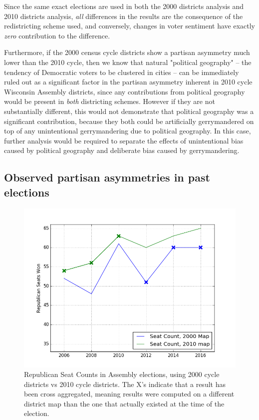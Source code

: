\documentclass[preprint,12pt]{article}
\begin{document}
Since the same exact elections are used in both the 2000 districts analysis and 2010 districts analysis, \emph{all} differences in the results are the consequence of the redistricting scheme used, and conversely, changes in voter sentiment have exactly \emph{zero} contribution to the difference.

Furthermore, if the 2000 census cycle districts show a partisan asymmetry much lower than the 2010 cycle, then we know that natural "political geography" -- the tendency of Democratic voters to be clustered in cities -- can be immediately ruled out as a significant factor in the partisan asymmetry inherent in 2010 cycle Wisconsin Assembly districts, since any contributions from political geography would be present in \emph{both} districting schemes.
However if they are not substantially different, this would not demonstrate that political geography was a significant contribution, because they both could be artificially gerrymandered on top of any unintentional gerrymandering due to political geography.
In this case, further analysis would be required to separate the effects of unintentional bias caused by political geography and deliberate bias caused by gerrymandering.

\subsection{Observed partisan asymmetries in past elections}

\begin{figure}[htb!]
    \begin{center}
        \includegraphics[scale=0.85]{../Figures/WI2010/WI_2000_2010_seats.png}
        \caption{Republican Seat Counts in Assembly elections, using 2000 cycle districts vs 2010 cycle districts. The X's indicate that a result has been cross aggregated, meaning results were computed on a different district map than the one that actually existed at the time of the election.}\label{fig:Seats20002010}
    \end{center}
\end{figure}
\end{document}
